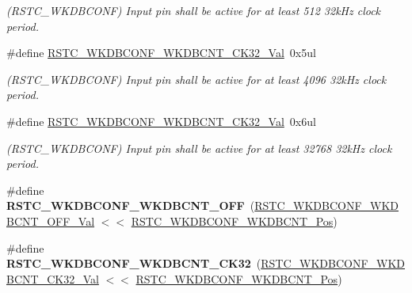 \begin{DoxyCompactItemize}
\begin{DoxyCompactList}\small\item\em (R\+S\+T\+C\+\_\+\+W\+K\+D\+B\+C\+O\+N\+F) Input pin shall be active for at least 512 32k\+Hz clock period. \end{DoxyCompactList}\item 
\hypertarget{group___s_a_m_l21___r_s_t_c_ga0c9da5e776fe21eb7a40d8dd300c8c12}{}\#define \hyperlink{group___s_a_m_l21___r_s_t_c_ga0c9da5e776fe21eb7a40d8dd300c8c12}{R\+S\+T\+C\+\_\+\+W\+K\+D\+B\+C\+O\+N\+F\+\_\+\+W\+K\+D\+B\+C\+N\+T\+\_\+C\+K32\+\_\+\+Val}~0x5ul\label{group___s_a_m_l21___r_s_t_c_ga0c9da5e776fe21eb7a40d8dd300c8c12}

\begin{DoxyCompactList}\small\item\em (R\+S\+T\+C\+\_\+\+W\+K\+D\+B\+C\+O\+N\+F) Input pin shall be active for at least 4096 32k\+Hz clock period. \end{DoxyCompactList}\item 
\hypertarget{group___s_a_m_l21___r_s_t_c_gac25485898bfb56326d149c9287ebe9b6}{}\#define \hyperlink{group___s_a_m_l21___r_s_t_c_gac25485898bfb56326d149c9287ebe9b6}{R\+S\+T\+C\+\_\+\+W\+K\+D\+B\+C\+O\+N\+F\+\_\+\+W\+K\+D\+B\+C\+N\+T\+\_\+C\+K32\+\_\+\+Val}~0x6ul\label{group___s_a_m_l21___r_s_t_c_gac25485898bfb56326d149c9287ebe9b6}

\begin{DoxyCompactList}\small\item\em (R\+S\+T\+C\+\_\+\+W\+K\+D\+B\+C\+O\+N\+F) Input pin shall be active for at least 32768 32k\+Hz clock period. \end{DoxyCompactList}\item 
\hypertarget{group___s_a_m_l21___r_s_t_c_gad8e65ef5e6817765b78c0c9ce8ca4024}{}\#define {\bfseries R\+S\+T\+C\+\_\+\+W\+K\+D\+B\+C\+O\+N\+F\+\_\+\+W\+K\+D\+B\+C\+N\+T\+\_\+\+O\+F\+F}~(\hyperlink{group___s_a_m_l21___r_s_t_c_ga66f6750ab0649d375b9dab6ba59dedce}{R\+S\+T\+C\+\_\+\+W\+K\+D\+B\+C\+O\+N\+F\+\_\+\+W\+K\+D\+B\+C\+N\+T\+\_\+\+O\+F\+F\+\_\+\+Val} $<$$<$ \hyperlink{group___s_a_m_l21___r_s_t_c_ga04802a267786aed951e1e31ab54ce6ad}{R\+S\+T\+C\+\_\+\+W\+K\+D\+B\+C\+O\+N\+F\+\_\+\+W\+K\+D\+B\+C\+N\+T\+\_\+\+Pos})\label{group___s_a_m_l21___r_s_t_c_gad8e65ef5e6817765b78c0c9ce8ca4024}

\item 
\hypertarget{group___s_a_m_l21___r_s_t_c_gade4a09eee168e6e12c919398028b288e}{}\#define {\bfseries R\+S\+T\+C\+\_\+\+W\+K\+D\+B\+C\+O\+N\+F\+\_\+\+W\+K\+D\+B\+C\+N\+T\+\_\+C\+K32}~(\hyperlink{group___s_a_m_l21___r_s_t_c_ga607221f82e1731394e9cd0cbbfb0f276}{R\+S\+T\+C\+\_\+\+W\+K\+D\+B\+C\+O\+N\+F\+\_\+\+W\+K\+D\+B\+C\+N\+T\+\_\+C\+K32\+\_\+\+Val} $<$$<$ \hyperlink{group___s_a_m_l21___r_s_t_c_ga04802a267786aed951e1e31ab54ce6ad}{R\+S\+T\+C\+\_\+\+W\+K\+D\+B\+C\+O\+N\+F\+\_\+\+W\+K\+D\+B\+C\+N\+T\+\_\+\+Pos})\label{group___s_a_m_l21___r_s_t_c_gade4a09eee168e6e12c919398028b288e}


\end{DoxyCompactItemize}
